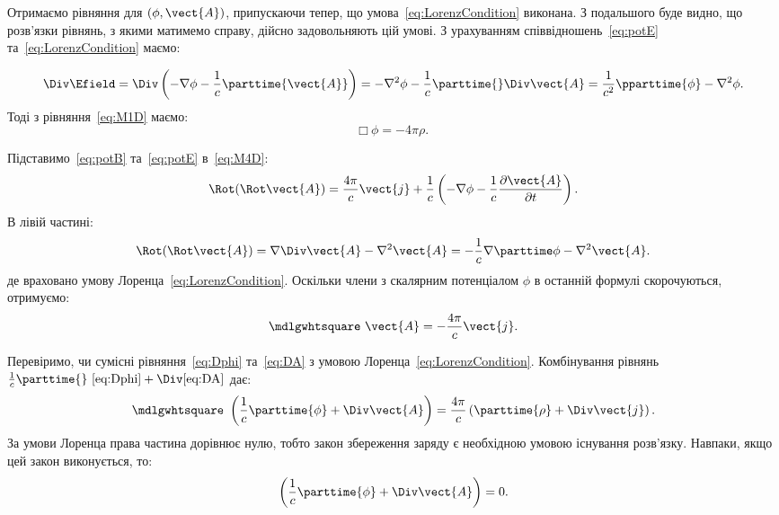 Отримаємо рівняння для $(\phi, \vect{A})$, припускаючи тепер, що умова~\eqref{eq:LorenzCondition}
виконана. З подальшого буде видно, що розв’язки рівнянь, з якими
матимемо справу, дійсно задовольняють цій умові. З урахуванням
співвідношень~\eqref{eq:potE} та~\eqref{eq:LorenzCondition} маємо:

\begin{equation*}
    \Div\Efield = \Div\left( -\nabla\phi - \frac1c \parttime{\vect{A}}\right) = - \nabla^2\phi - \frac1c \parttime{}\Div\vect{A} =
    \frac1{c^2}\pparttime{\phi} - \nabla^2\phi.
\end{equation*}
Тоді з рівняння~\eqref{eq:M1D} маємо:
\begin{equation}\label{eq:Dphi}
	\mdlgwhtsquare\  \phi = -4\pi \rho.
\end{equation}

Підставимо~\eqref{eq:potB} та~\eqref{eq:potE} в~\eqref{eq:M4D}:
\begin{equation*}
    \Rot(\Rot\vect{A}) = \frac{4\pi}{c}\vect{j}
+ \frac{1}{c}\left( -\nabla \phi - \frac{1}{c}\frac{\partial \vect{A}}{\partial t} \right).
\end{equation*}
В лівій частині:
\begin{equation*}
    \Rot(\Rot\vect{A}) = \nabla \Div\vect{A} - \nabla^2\vect{A} = -\frac1c \nabla \parttime\phi - \nabla^2\vect{A}.
\end{equation*}
де враховано умову Лоренца~\eqref{eq:LorenzCondition}. Оскільки члени з скалярним потенціалом
$\phi$ в останній формулі скорочуються, отримуємо:
\begin{equation}\label{eq:DA}
	\mdlgwhtsquare\  \vect{A} = -\frac{4\pi}{c} \vect{j}.
\end{equation}

Перевіримо, чи сумісні рівняння~\eqref{eq:Dphi} та~\eqref{eq:DA} з умовою Лоренца~\eqref{eq:LorenzCondition}.
Комбінування рівнянь $\frac1c \parttime{}~\eqref{eq:Dphi} + \Div\eqref{eq:DA}$ дає:
\begin{equation}
	\mdlgwhtsquare\ \left( \frac1c \parttime{\phi} + \Div\vect{A} \right) = \frac{4\pi}c \left( \parttime{\rho} + \Div\vect{j}\right)  .
\end{equation}
За умови Лоренца права частина дорівнює нулю, тобто закон збереження
заряду є необхідною умовою існування розв’язку. Навпаки, якщо цей закон
виконується, то:
\begin{equation}\label{eq:LorentzCalibr}
	\left( \frac1c \parttime{\phi} + \Div\vect{A} \right) = 0.
\end{equation}

